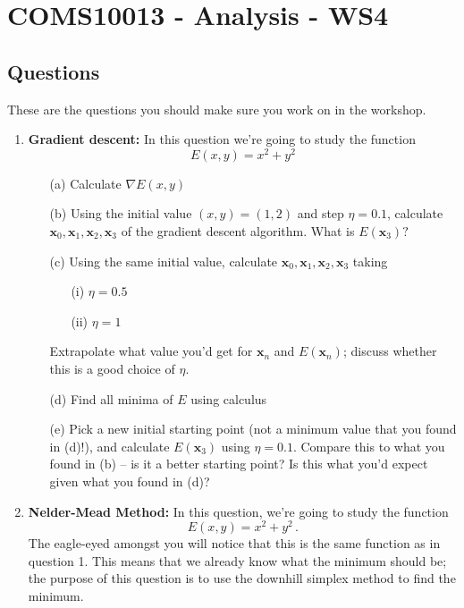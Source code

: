 \documentclass[11pt,a4paper]{scrartcl}
\begin{document}
\section*{COMS10013 - Analysis - WS4}

\subsection*{Questions}

These are the questions you should make sure you work on in the workshop.

\begin{enumerate}
\item {\textbf{Gradient descent: }} In this question we're going to study the function 
\[E(x,y) = x^2 + y^2\]
\begin{enumerate}
    \item[(a)] Calculate $\nabla E(x,y)$ 
    \item[(b)] Using the initial value $(x,y) = (1,2)$ and step $\eta = 0.1$, calculate $\mathbf{x}_0, \mathbf{x}_1, \mathbf{x}_2, \mathbf{x}_3$ of the gradient descent algorithm. What is $E(\mathbf{x}_3)?$
    \item[(c)] Using the same initial value, calculate $\mathbf{x}_0, \mathbf{x}_1, \mathbf{x}_2, \mathbf{x}_3$ taking
    \begin{enumerate}
        \item[(i)] $\eta = 0.5$
        \item[(ii)] $\eta = 1$
    \end{enumerate}
    Extrapolate what value you'd get for $\mathbf{x}_n$ and $E(\mathbf{x}_n)$; discuss whether this is a good choice of $\eta$.
    \item[(d)] Find all minima of $E$ using calculus 
    \item[(e)] Pick a new initial starting point (not a minimum value that you found in (d)!), and calculate $E(\mathbf{x}_3)$ using $\eta = 0.1$. Compare this to what you found in (b) -- is it a better starting point? Is this what you'd expect given what you found in (d)?
\end{enumerate}

\item \textbf{Nelder-Mead Method:} In this question, we're going to study the function 
\[
    E(x,y) = x^2 + y^2\,.
\]
The eagle-eyed amongst you will notice that this is the same function as in question 1. This means that we already know what the minimum should be; the purpose of this question is to use the downhill simplex method to find the minimum. 


\end{enumerate}
\end{document}
